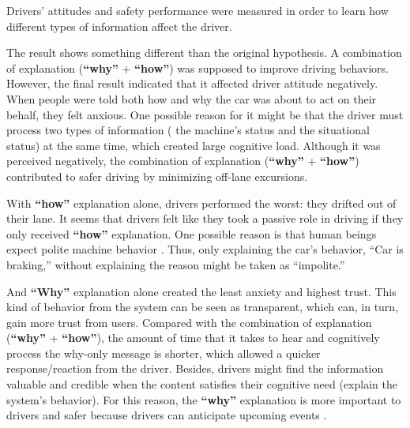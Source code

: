    \indent Drivers' attitudes and safety performance were measured in order to learn how different types of information affect the driver. 

    \indent The result shows something different than the original hypothesis. A combination of explanation (\textbf{``why''} + \textbf{``how''}) was supposed to improve driving behaviors. However, the final result indicated that it affected driver attitude negatively. When people were told both how and why the car was about to act on their behalf, they felt anxious. One possible reason for it might be that the driver must process two types of information ( the machine’s status and the situational status) at the same time, which created large cognitive load. Although it was perceived negatively, the combination of explanation (\textbf{``why''} + \textbf{``how''}) contributed to safer driving by minimizing off-lane excursions. 

    \indent With \textbf{``how''} explanation alone, drivers performed the worst: they drifted out of their lane. It seems that drivers felt like they took a passive role in driving if they only received \textbf{``how''} explanation. One possible reason is that human beings expect polite machine behavior \cite{reeves1996people}. Thus, only explaining the car’s behavior, ``Car is braking,'' without explaining the reason might be taken as “impolite.”

    \indent And \textbf{``Why''} explanation alone created the least anxiety and highest trust. This kind of behavior from the system can be seen as transparent, which can, in turn, gain more trust from users. Compared with the combination of explanation (\textbf{``why''} + \textbf{``how''}), the amount of time that it takes to hear and cognitively process the why-only message is shorter, which allowed a quicker response/reaction from the driver. Besides, drivers might find the information valuable and credible when the content satisfies their cognitive need (explain the system's behavior). For this reason, the \textbf{``why''} explanation is more important to drivers and safer because drivers can anticipate upcoming events \cite{koo2015did}.